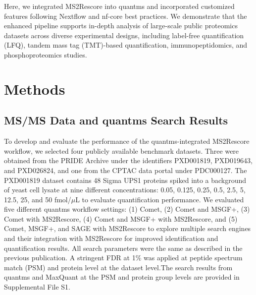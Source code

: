 \documentclass[12pt]{article}
\begin{document}
Here, we integrated MS2Rescore into quantms and incorporated customized features following Nextflow and nf-core best practices. We demonstrate that the enhanced pipeline supports in-depth analysis of large-scale public proteomics datasets across diverse experimental designs, including label-free quantification (LFQ), tandem mass tag (TMT)-based quantification, immunopeptidomics, and phosphoproteomics studies.

\section{Methods}

\subsection{MS/MS Data and quantms Search Results}
To develop and evaluate the performance of the quantms-integrated MS2Rescore workflow, we selected four publicly available benchmark datasets. Three were obtained from the PRIDE Archive under the identifiers PXD001819, PXD019643, and PXD026824, and one from the CPTAC data portal under PDC000127. The PXD001819 dataset contains 48 Sigma UPS1 proteins spiked into a background of yeast cell lysate at nine different concentrations: 0.05, 0.125, 0.25, 0.5, 2.5, 5, 12.5, 25, and 50 fmol/$\mu$L to evaluate quantification performance. We evaluated five different quantms workflow settings: (1) Comet, (2) Comet and MSGF+, (3) Comet with MS2Rescore, (4) Comet and MSGF+ with MS2Rescore, and (5) Comet, MSGF+, and SAGE with MS2Rescore to explore multiple search engines and their integration with MS2Rescore for improved identification and quantification results. All search parameters were the same as described in the previous publication. A stringent FDR at 1\% was applied at peptide spectrum match (PSM) and protein level at the dataset level.The search results from quantms and MaxQuant at the PSM and protein group levels are provided in Supplemental File S1.
\end{document}
